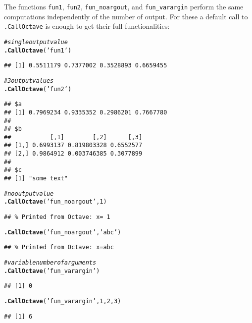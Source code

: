 \documentclass[english,10pt,a4paper]{article}\usepackage[]{graphicx}\usepackage[]{color}
\makeatletter
\newcommand{\hlnum}[1]{\textcolor[rgb]{0.686,0.059,0.569}{#1}}%
\newcommand{\hlstr}[1]{\textcolor[rgb]{0.192,0.494,0.8}{#1}}%
\newcommand{\hlcom}[1]{\textcolor[rgb]{0.678,0.584,0.686}{\textit{#1}}}%
\newcommand{\hlstd}[1]{\textcolor[rgb]{0.345,0.345,0.345}{#1}}%
\newcommand{\hlkwd}[1]{\textcolor[rgb]{0.737,0.353,0.396}{\textbf{#1}}}%
\newenvironment{kframe}{%
 \def\at@end@of@kframe{}%
 \ifinner\ifhmode%
  \def\at@end@of@kframe{\end{minipage}}%
  \begin{minipage}{\columnwidth}%
 \fi\fi%
 \def\FrameCommand##1{\hskip\@totalleftmargin \hskip-\fboxsep
 \colorbox{shadecolor}{##1}\hskip-\fboxsep
     \hskip-\linewidth \hskip-\@totalleftmargin \hskip\columnwidth}%
 \MakeFramed {\advance\hsize-\width
   \@totalleftmargin\z@ \linewidth\hsize
   \@setminipage}}%
 {\par\unskip\endMakeFramed%
 \at@end@of@kframe}
\newenvironment{knitrout}{}{} %
\let\code=\texttt
\makeatother
\begin{document}
The functions \code{fun1}, \code{fun2}, \code{fun\_noargout}, and
\code{fun\_varargin} perform the same computations independently of the number
of output.
For these a default call to \code{.CallOctave} is enough to get their full
functionalities:

\begin{knitrout}
\color{fgcolor}\begin{kframe}
\begin{alltt}
\hlcom{# single output value}
\hlkwd{.CallOctave}\hlstd{(}\hlstr{'fun1'}\hlstd{)}
\end{alltt}
\begin{verbatim}
## [1] 0.5511179 0.7377002 0.3528893 0.6659455
\end{verbatim}
\begin{alltt}
\hlcom{# 3 output values }
\hlkwd{.CallOctave}\hlstd{(}\hlstr{'fun2'}\hlstd{)}
\end{alltt}
\begin{verbatim}
## $a
## [1] 0.7969234 0.9335352 0.2986201 0.7667780
## 
## $b
##           [,1]        [,2]      [,3]
## [1,] 0.6993137 0.819803328 0.6552577
## [2,] 0.9864912 0.003746385 0.3077899
## 
## $c
## [1] "some text"
\end{verbatim}
\begin{alltt}
\hlcom{# no output value}
\hlkwd{.CallOctave}\hlstd{(}\hlstr{'fun_noargout'}\hlstd{,} \hlnum{1}\hlstd{)}
\end{alltt}
\begin{verbatim}
## % Printed from Octave: x= 1
\end{verbatim}
\begin{alltt}
\hlkwd{.CallOctave}\hlstd{(}\hlstr{'fun_noargout'}\hlstd{,} \hlstr{'abc'}\hlstd{)}
\end{alltt}
\begin{verbatim}
## % Printed from Octave: x=abc
\end{verbatim}
\begin{alltt}
\hlcom{# variable number of arguments}
\hlkwd{.CallOctave}\hlstd{(}\hlstr{'fun_varargin'}\hlstd{)}
\end{alltt}
\begin{verbatim}
## [1] 0
\end{verbatim}
\begin{alltt}
\hlkwd{.CallOctave}\hlstd{(}\hlstr{'fun_varargin'}\hlstd{,} \hlnum{1}\hlstd{,} \hlnum{2}\hlstd{,} \hlnum{3}\hlstd{)}
\end{alltt}
\begin{verbatim}
## [1] 6
\end{verbatim}
\end{kframe}
\end{knitrout}
\end{document}
